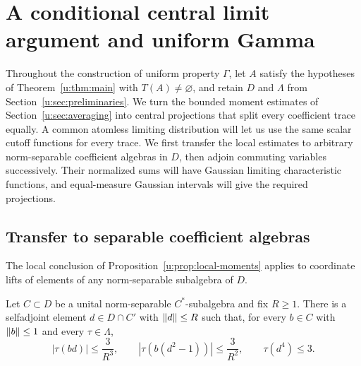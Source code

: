 \section{A conditional central limit argument and uniform Gamma}
\label{u:sec:gamma}

Throughout the construction of uniform property $\Gamma$, let $A$
satisfy the hypotheses of Theorem~\ref{u:thm:main} with
$T(A)\ne\varnothing$, and retain $D$ and $\Lambda$ from
Section~\ref{u:sec:preliminaries}.  We turn the bounded moment estimates
of Section~\ref{u:sec:averaging} into central projections that split
every coefficient trace equally.  A common atomless limiting
distribution will let us use the same scalar cutoff functions for
every trace.  We first transfer the local estimates to arbitrary
norm-separable coefficient algebras in $D$, then adjoin commuting
variables successively.  Their normalized sums will have Gaussian limiting
characteristic functions, and equal-measure Gaussian intervals will
give the required projections.

\subsection{Transfer to separable coefficient algebras}

The local conclusion of Proposition~\ref{u:prop:local-moments} applies
to coordinate lifts of elements of any norm-separable subalgebra of
$D$.

\begin{proposition}
\label{u:prop:relative-moments}
Let $C\subset D$ be a unital norm-separable $C^*$-subalgebra and fix
$R\geq1$.  There is a selfadjoint element $d\in D\cap C'$ with
$\lVert d\rVert\leq R$ such that, for every $b\in C$ with $\lVert b\rVert\leq1$ and
every $\tau\in\Lambda$,
\begin{equation}
\label{u:eq:relative-moments}
  |\tau(bd)|\leq\frac{3}{R^3},\qquad
  |\tau(b(d^2-1))|\leq\frac{3}{R^2},\qquad
  \tau(d^4)\leq3.
\end{equation}
\end{proposition}

